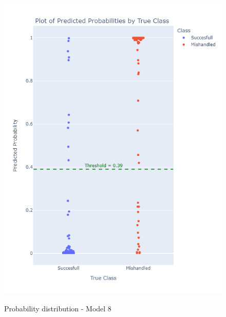 \documentclass[12pt]{article}
\begin{document}
\begin{figure}
\begin{minipage}[c]{0.4\linewidth}
    \includegraphics[width=1\textwidth]{Probability_distribution_Model 8.png}\\
    \caption{Probability distribution - Model 8}
\end{minipage}%
\hfill
\begin{minipage}[c]{0.4\linewidth}

\end{minipage}
\end{figure}
\end{document}
